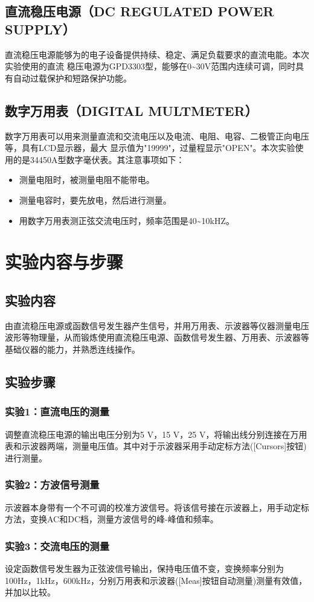 \documentclass[a4paper,11pt,UTF8]{ctexart}
\begin{document}
\subsection{直流稳压电源（DC REGULATED POWER SUPPLY）}
直流稳压电源能够为的电子设备提供持续、稳定、满足负载要求的直流电能。本次实验使用的直流
稳压电源为GPD3303型，能够在0\~{}30V范围内连续可调，同时具有自动过载保护和短路保护功能。
\subsection{数字万用表（DIGITAL MULTMETER）}
数字万用表可以用来测量直流和交流电压以及电流、电阻、电容、二极管正向电压等，具有LCD显示器，最大
显示值为"19999"，过量程显示"OPEN"。本次实验使用的是34450A型数字毫伏表。其注意事项如下：
\begin{itemize}
  \item 测量电阻时，被测量电阻不能带电。
  \item 测量电容时，要先放电，然后进行测量。
  \item 用数字万用表测正弦交流电压时，频率范围是40\~{}10kHZ。
\end{itemize}
\section{实验内容与步骤}
\subsection{实验内容}
	由直流稳压电源或函数信号发生器产生信号，并用万用表、示波器等仪器测量电压波形等物理量，从而锻炼使用直流稳压电源、函数信号发生器、万用表、示波器等基础仪器的能力，并熟悉连线操作。
\subsection{实验步骤}
	\subsubsection{实验1：直流电压的测量}
		调整直流稳压电源的输出电压分别为5 V，15 V，25 V，将输出线分别连接在万用表和示波器两端，测量电压值。其中对于示波器采用手动定标方法([Cursors]按钮)进行测量。
	\subsubsection{实验2：方波信号测量}
		示波器本身带有一个不可调的校准方波信号。将该信号接在示波器上，用手动定标方法，变换AC和DC档，测量方波信号的峰-峰值和频率。
	\subsubsection{实验3：交流电压的测量}
		设定函数信号发生器为正弦波信号输出，保持电压值不变，变换频率分别为100Hz，1kHz，600kHz，分别万用表和示波器([Meas]按钮自动测量)测量有效值，并加以比较。
\end{document}
